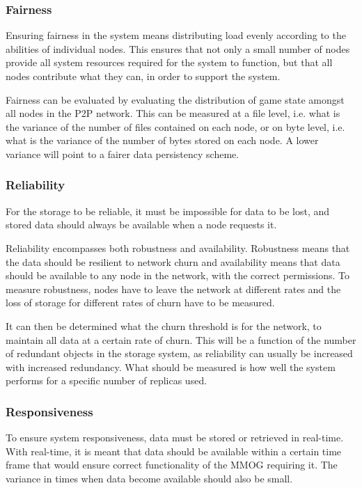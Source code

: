 \documentclass[10pt,a4paper,journal,cspaper,compsoc]{IEEEtran}
\begin{document}
\subsubsection{Fairness}
Ensuring fairness in the system means distributing load evenly according to the abilities of individual nodes. This ensures that not only a small
number of nodes provide all system resources required for the system to function, but that all nodes contribute what they can, in order to support
the system.

Fairness can be evaluated by evaluating the distribution of game state amongst all nodes in the P2P network. This can be measured at a file level,
i.e. what is the variance of the number of files contained on each node, or on byte level, i.e. what is the variance of the number of bytes stored on
each node. A lower variance will point to a fairer data persistency scheme.

\subsubsection{Reliability}
For the storage to be reliable, it must be impossible for data to be lost, and stored data should always be available when a node requests it.

Reliability encompasses both robustness and availability. Robustness means that the data should be resilient to network churn and availability means
that data should be available to any node in the network, with the correct permissions. To measure robustness, nodes have to leave the network at
different rates and the loss of storage for different rates of churn have to be measured.

It can then be determined what the churn threshold is for the network, to maintain all data at a certain rate of churn. This will be a function of
the number of redundant objects in the storage system, as reliability can usually be increased with increased redundancy. What should be measured is
how well the system performs for a specific number of replicas used.

\subsubsection{Responsiveness}
To ensure system responsiveness, data must be stored or retrieved in real-time. With real-time, it is meant that data should be available within a
certain time frame that would ensure correct functionality of the MMOG requiring it. The variance in times when data become available should also be
small.
\end{document}

